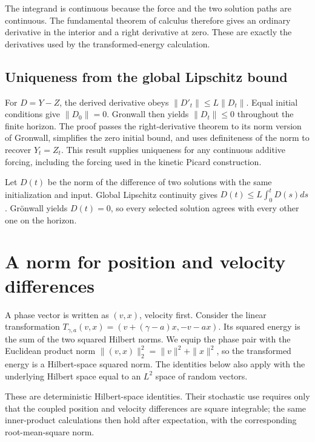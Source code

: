 \documentclass[11pt,a4paper]{report}
\begin{document}
The integrand is continuous because the force and the two solution paths are continuous. The fundamental theorem of calculus therefore gives an ordinary derivative in the interior and a right derivative at zero. These are exactly the derivatives used by the transformed-energy calculation.

\subsection{\texorpdfstring{Uniqueness from the global Lipschitz bound}{Uniqueness from the global Lipschitz bound}}
\label{report-step-KineticLangevin-IntegralCoupling-lean-3}


For \(D=Y-Z\), the derived derivative obeys \(\|D\prime_t\|\le L\|D_t\|\). Equal initial conditions give \(\|D_0\|=0\). Gronwall then yields \(\|D_t\|\le0\) throughout the finite horizon. The proof passes the right-derivative theorem to its norm version of Gronwall, simplifies the zero initial bound, and uses definiteness of the norm to recover \(Y_t=Z_t\). This result supplies uniqueness for any continuous additive forcing, including the forcing used in the kinetic Picard construction.



Let \(D(t)\) be the norm of the difference of two solutions with the same initialization and input. Global Lipschitz continuity gives \(D(t)\le L\int_0^tD(s)ds\). Grönwall yields \(D(t)=0\), so every selected solution agrees with every other one on the horizon.

\section{\texorpdfstring{A norm for position and velocity differences}{A norm for position and velocity differences}}
\label{proof-module-KineticLangevin-Geometry-lean}


A phase vector is written as \((v,x)\), velocity first. Consider the linear transformation \(T_{\gamma,a}(v,x)=(v+(\gamma-a)x,-v-ax)\). Its squared energy is the sum of the two squared Hilbert norms. We equip the phase pair with the Euclidean product norm \(\|(v,x)\|_2^2=\|v\|^2+\|x\|^2\), so the transformed energy is a Hilbert-space squared norm. The identities below also apply with the underlying Hilbert space equal to an \(L^{2}\) space of random vectors.



These are deterministic Hilbert-space identities. Their stochastic use requires only that the coupled position and velocity differences are square integrable; the same inner-product calculations then hold after expectation, with the corresponding root-mean-square norm.
\end{document}
